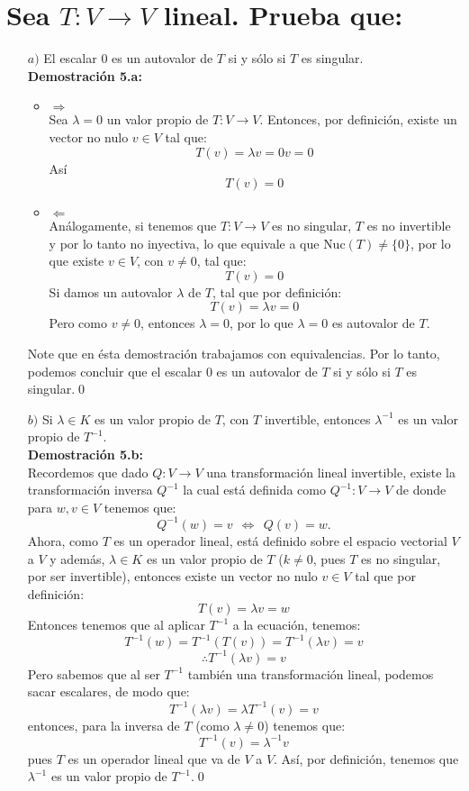 \section{Sea $T:V \longrightarrow V$ lineal. Prueba que:}
\begin{enumerate}
\item[$a)$]El escalar 0 es un autovalor de $T$ si y sólo si $T$ es singular.\\
\textbf{Demostración 5.a:}
\begin{itemize}
    \item $\Longrightarrow$\\
    Sea $\lambda = 0$ un valor propio de $T:V\longrightarrow V$. Entonces, por definición, existe un vector no nulo $v \in V$ tal que:
\[T(v)=\lambda v = 0 v = 0\]
Así
\[ T(v) = 0\]
    \item $\Longleftarrow$\\
    An\'alogamente, si tenemos que $T:V\longrightarrow V$ es no singular, $T$ es no invertible y por lo tanto no inyectiva, lo que equivale a que $\text{Nuc}(T)\neq \{0\}$, por lo que existe $v\in V$, con $v\neq 0$, tal que:
    \[ T(v) = 0\]
    Si damos un autovalor $\lambda$ de $T$, tal que por definici\'on:
    \[T(v)=\lambda v =0\]
    Pero como $v\neq0$, entonces $\lambda = 0$, por lo que $\lambda =0$ es autovalor de $T$.
\end{itemize}

Note que en ésta demostración trabajamos con equivalencias. Por lo tanto, podemos concluir que el escalar 0 es un autovalor de $T$ si y sólo si $T$ es singular.\qed

\item[$b)$]Si $\lambda \in K$ es un valor propio de $T$, con $T$ invertible, entonces $\lambda^{-1}$ es un valor propio de $T^{-1}$.\\
\textbf{Demostración 5.b:}\\
Recordemos que dado $Q:V \longrightarrow V$ una transformación lineal invertible, existe la transformación inversa $Q^{-1}$ la cual está definida como $Q^{-1}:V \longrightarrow V$ de donde para $w,v \in V$ tenemos que:
\[Q^{-1}(w) = v ~~\Longleftrightarrow~~ Q(v)=w. \]
Ahora, como $T$ es un operador lineal, está definido sobre el espacio vectorial $V$ a $V$ y además, $\lambda \in K$ es un valor propio de $T$ ($k\neq0$, pues $T$ es no singular, por ser invertible), entonces existe un vector no nulo $v \in V$ tal que por definici\'on:
\[ T(v)= \lambda v=w\]
Entonces tenemos que al aplicar $T^{-1}$ a la ecuaci\'on, tenemos:
\[T^{-1}(w)=T^{-1}(T(v))=T^{-1}(\lambda v)=v\]
\[\therefore T^{-1}(\lambda v)=v\]
Pero sabemos que al ser $T^{-1}$ tambi\'en una transformaci\'on lineal, podemos sacar escalares, de modo que:
\[T^{-1}(\lambda v)=\lambda T^{-1}( v)=v\]
entonces, para la inversa de $T$ (como $\lambda\neq 0$) tenemos que:
\[ T^{-1}(v)=\lambda^{-1}v \]
pues $T$ es un operador lineal que va de $V$ a $V$. Así, por definición, tenemos que $\lambda^{-1}$ es un valor propio de $T^{-1}$.\qed
\end{enumerate}